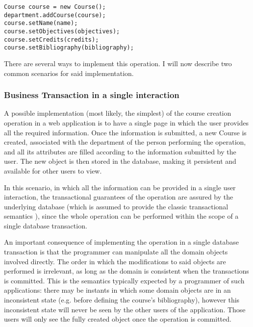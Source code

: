 \documentclass{llncs}
\begin{document}
\begin{lstlisting}
Course course = new Course();
department.addCourse(course);
course.setName(name);
course.setObjectives(objectives);
course.setCredits(credits);
course.setBibliography(bibliography);
\end{lstlisting}

There are several ways to implement this operation. I will now
describe two common scenarios for said implementation.

\subsubsection{Business Transaction in a single interaction}

A possible implementation (most likely, the simplest) of the course
creation operation in a web application is to have a single page in
which the user provides all the required information. Once the
information is submitted, a new Course is created, associated with the
department of the person performing the operation, and all its
attributes are filled according to the information submitted by the
user. The new object is then stored in the database, making it
persistent and available for other users to view.

In this scenario, in which all the information can be provided in a
single user interaction, the transactional guarantees of the operation are
assured by the underlying database (which is assumed to provide the
classic transactional semantics \cite{gray1981transaction}), since the
whole operation can be performed within the scope of a single database
transaction.

An important consequence of implementing the operation in a single
database transaction is that the programmer can manipulate all the domain
objects involved directly. The order in which the modifications to
said objects are performed is irrelevant, as long as the domain is
consistent when the transactions is committed. This is the semantics
typically expected by a programmer of such applications: there may be
instants in which some domain objects are in an inconsistent state
(e.g. before defining the course's bibliography), however this
inconsistent state will never be seen by the other users of the
application. Those users will only see the fully created object once
the operation is committed.
\end{document}
